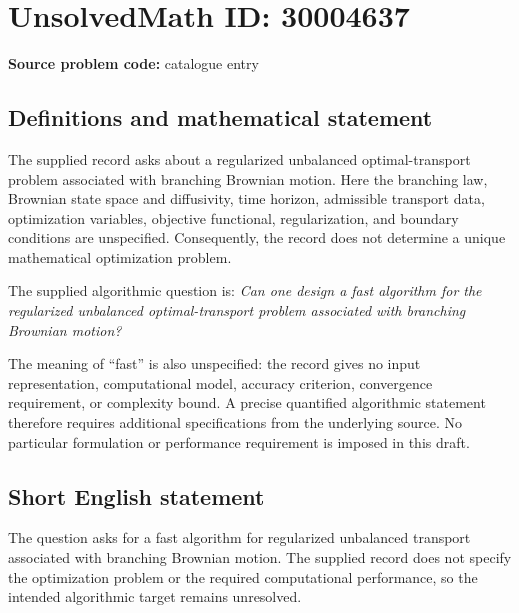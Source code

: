\documentclass[11pt]{article}
\begin{document}
\section*{UnsolvedMath ID: 30004637}
\textbf{Source problem code:} catalogue entry
\subsection{Definitions and mathematical statement}
The supplied record asks about a regularized unbalanced optimal-transport problem associated with branching Brownian motion. Here the branching law, Brownian state space and diffusivity, time horizon, admissible transport data, optimization variables, objective functional, regularization, and boundary conditions are unspecified. Consequently, the record does not determine a unique mathematical optimization problem.

The supplied algorithmic question is: \emph{Can one design a fast algorithm for the regularized unbalanced optimal-transport problem associated with branching Brownian motion?}

The meaning of ``fast'' is also unspecified: the record gives no input representation, computational model, accuracy criterion, convergence requirement, or complexity bound. A precise quantified algorithmic statement therefore requires additional specifications from the underlying source. No particular formulation or performance requirement is imposed in this draft.
\subsection{Short English statement}
The question asks for a fast algorithm for regularized unbalanced transport associated with branching Brownian motion. The supplied record does not specify the optimization problem or the required computational performance, so the intended algorithmic target remains unresolved.
\end{document}
